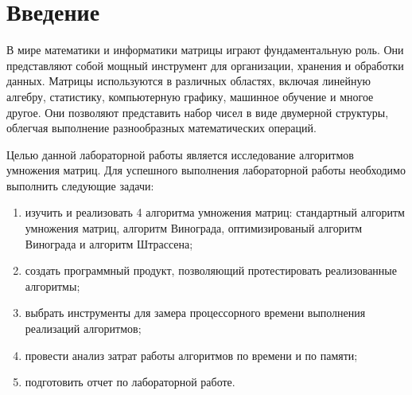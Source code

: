\chapter*{Введение}

В мире математики и информатики матрицы играют фундаментальную роль. Они представляют собой мощный инструмент для организации, хранения и обработки данных. Матрицы используются в различных областях, включая линейную алгебру, статистику, компьютерную графику, машинное обучение и многое другое. Они позволяют представить набор чисел в виде двумерной структуры, облегчая выполнение разнообразных математических операций.

Целью данной лабораторной работы является исследование алгоритмов умножения матриц. 
Для успешного выполнения лабораторной работы необходимо выполнить следующие задачи: 
\begin{enumerate}[label={\arabic*)}]
	\item изучить и реализовать 4 алгоритма умножения матриц: стандартный алгоритм умножения матриц, алгоритм Винограда, оптимизированый алгоритм Винограда и алгоритм Штрассена;
	\item создать программный продукт, позволяющий протестировать реализованные алгоритмы;
	\item выбрать инструменты для замера процессорного времени выполнения реализаций алгоритмов;
	\item провести анализ затрат работы алгоритмов по времени и по памяти;
	\item подготовить отчет по лабораторной работе.
\end{enumerate}